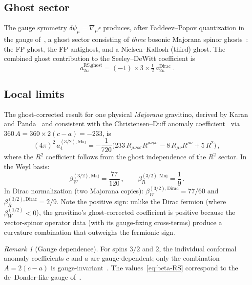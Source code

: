 \documentclass[aps,prd,twocolumn,superscriptaddress,nofootinbib,floatfix]{revtex4-2}
\theoremstyle{definition}
\theoremstyle{remark}
\newtheorem{remark}[theorem]{Remark}
\newcommand{\Ricsq}{R_{\mu\nu}R^{\mu\nu}}
\newcommand{\Riemsq}{R_{\mu\nu\rho\sigma}R^{\mu\nu\rho\sigma}}
\begin{document}
\subsection{Ghost sector}

The gauge symmetry $\delta\psi_\mu = \nabla_\mu\epsilon$ produces, after
Faddeev--Popov quantization in the gauge of~\cite{Karan:2017txu}, a ghost
sector consisting of \emph{three} bosonic Majorana spinor
ghosts~\cite{KaranPanda:2021,Lekeu:2021ieh}: the FP ghost, the FP antighost,
and a Nielsen--Kallosh (third) ghost. The combined ghost contribution to the
Seeley--DeWitt coefficient is~\cite{KaranPanda:2021}
\begin{equation}
  a_{2n}^{\text{RS,ghost}} = (-1) \times 3 \times \tfrac{1}{2}\,
    a_{2n}^{\text{Dirac}}\,.
  \label{eq:RS-ghost}
\end{equation}

\subsection{Local limits}

The ghost-corrected result for one physical \emph{Majorana} gravitino,
derived by Karan and Panda~\cite{KaranPanda:2021} and consistent with the
Christensen--Duff anomaly
coefficient~\cite{ChristensenDuff:1979,ChristensenDuff:1980} via
$360\,A = 360\times 2(c - a) = -233$, is
\begin{equation}
  (4\pi)^2\,a_4^{(3/2),\text{Maj}}
  = -\frac{1}{720}\bigl(233\,\Riemsq - 8\,\Ricsq + 5\,R^2\bigr)\,,
  \label{eq:a4-RS-full}
\end{equation}
where the $R^2$ coefficient follows from the ghost independence of the
$R^2$ sector. In the Weyl basis:
\begin{equation}
  \boxed{
    \beta_W^{(3/2),\text{Maj}} = \frac{77}{120}\,,\qquad
    \beta_R^{(3/2),\text{Maj}} = \frac{1}{9}\,.
  }
  \label{eq:beta-RS}
\end{equation}
In Dirac normalization (two Majorana copies):
$\beta_W^{(3/2),\text{Dirac}} = 77/60$ and
$\beta_R^{(3/2),\text{Dirac}} = 2/9$.
Note the positive sign: unlike the Dirac fermion (where
$\beta_W^{(1/2)} < 0$), the gravitino's ghost-corrected coefficient is
positive because the vector-spinor operator data (with its gauge-fixing
cross-terms) produce a curvature combination that outweighs the fermionic
sign.

\begin{remark}[Gauge dependence]
\label{rem:gauge-dep}
For spins $3/2$ and $2$, the individual conformal anomaly coefficients $c$
and $a$ are gauge-dependent; only the combination $A = 2(c - a)$ is
gauge-invariant~\cite{ChristensenDuff:1979,vanNieuwenhuizen:1981ae}. The
values~\eqref{eq:beta-RS} correspond to the de~Donder-like gauge
of~\cite{Karan:2017txu}.
\end{remark}
\end{document}
